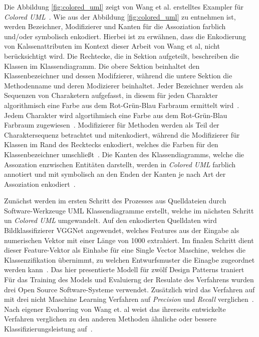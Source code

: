 Die Abbildung \ref{fig:colored_uml} zeigt von Wang et al. erstelltes Exampler für \textit{Colored UML}~\cite[S. 11]{app12178718}. Wie aus der Abbildung \ref{fig:colored_uml} zu entnehmen ist, werden Bezeichner, Modifizierer und Kanten für die Assoziation farblich und/oder symbolisch enkodiert.
Hierbei ist zu erwähnen, dass die Enkodierung von Kalssenattributen im Kontext dieser Arbeit von Wang et al, nicht berücksichtigt wird.
Die Rechtecke, die in Sektion aufgeteilt, beschreiben die Klassen im Klassendiagramm. Die obere Sektion beinhaltet den Klassenbezeichner und dessen Modifzierer, während die untere Sektion die Methodenname und deren Modizierer beinhaltet. 
Jeder Bezeichner werden als Sequenzen von Charaketern aufgefasst, in diesem für jeden Charakter algorithmisch eine Farbe aus dem Rot-Grün-Blau Farbraum ermittelt wird~\cite[S. 9, S. 10]{app12178718}.
Jedem Charakter wird algortihmisch eine Farbe aus dem Rot-Grün-Blau Farbraum zugewiesen~\cite[S. 6]{app12178718}. Modifizierer für Methoden werden als Teil der Charaktersequenz betrachtet und mitenkodiert, während die Modifizierer für Klassen im Rand des Recktecks enkodiert, welches die Farben für den Klassenbezeichner umschließt~\cite[S. 6]{app12178718}.
Die Kanten des Klassendiagramms, welche die Assozation enzwischen Entitäten darstellt, werden in \textit{Colored UML} farblich annotiert und mit symbolisch an den Enden der Kanten je nach Art der Assoziation enkodiert~\cite[S. 6]{app12178718}.

Zunächst werden im ersten Schritt des Prozesses aus Quelldateien durch Software-Werkzeuge UML Klassendiagramme erstellt, welche im nächsten Schritt un \textit{Colored UML} umgewandelt.
Auf den enkodierten Quelldaten wird Bildklassifizierer VGGNet angewendet, welches Features aus der Eingabe als numerischen Vektor mit einer Länge von 1000 extrahiert. Im finalen Schritt dient dieser Feature-Vektor als Einhabe für eine Single Vector Maschine, welches die Klassenzifikation übernimmt, zu welchen Entwurfsmuster die Einagbe zugeordnet werden kann~\cite[S. 13]{app12178718}.
Das hier presentierte Modell für zwölf Design Patterns traniert~\cite[S. 15]{app12178718}
Für das Training des Models und Evaluierng der Resulate des Verfahrens wurden drei Open Source Software-Systeme verwendet. Zusätzlich wird das Verfahren auf mit drei nicht Maschine Learning Verfahren auf \textit{Precision} und \textit{Recall} verglichen~\cite[S. 20]{app12178718}.
Nach eigener Evaluering von Wang et. al weist das ihrerseits entwickelte Verfahren verglichen zu den anderen Methoden ähnliche oder bessere Klassifizierungsleistung auf~\cite[S. 22]{app12178718}.

